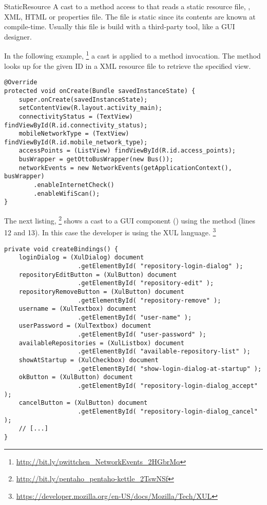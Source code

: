 \begin{pattern}{StaticResource}
A cast to a method access to that reads a static resource file, \eg,
XML, HTML or \java{} properties file.
The file is static since its contents are known at compile-time.
Usually this file is build with a third-party tool, like a GUI designer.

\instances{}
In the following example,%
\footnote{\url{http://bit.ly/pwittchen_NetworkEvents_2HGbrMq}}
a cast is applied to a  method invocation.
The  method looks up for the given ID in a XML resource file to retrieve the specified view. 

\begin{verbatim}
@Override
protected void onCreate(Bundle savedInstanceState) {
    super.onCreate(savedInstanceState);
    setContentView(R.layout.activity_main);
    connectivityStatus = (TextView) findViewById(R.id.connectivity_status);
    mobileNetworkType = (TextView) findViewById(R.id.mobile_network_type);
    accessPoints = (ListView) findViewById(R.id.access_points);
    busWrapper = getOttoBusWrapper(new Bus());
    networkEvents = new NetworkEvents(getApplicationContext(), busWrapper)
        .enableInternetCheck()
        .enableWifiScan();
}
\end{verbatim}

The next listing,%
\footnote{\url{http://bit.ly/pentaho_pentaho-kettle_2TswNSf}}
shows a cast to a GUI component () using the  method (lines 12 and 13).
In this case the developer is using the XUL language.%
\footnote{\url{https://developer.mozilla.org/en-US/docs/Mozilla/Tech/XUL}}

\begin{verbatim}
private void createBindings() {
    loginDialog = (XulDialog) document
                    .getElementById( "repository-login-dialog" );
    repositoryEditButton = (XulButton) document
                    .getElementById( "repository-edit" );
    repositoryRemoveButton = (XulButton) document
                    .getElementById( "repository-remove" );
    username = (XulTextbox) document
                    .getElementById( "user-name" );
    userPassword = (XulTextbox) document
                    .getElementById( "user-password" );
    availableRepositories = (XulListbox) document
                    .getElementById( "available-repository-list" );
    showAtStartup = (XulCheckbox) document
                    .getElementById( "show-login-dialog-at-startup" );
    okButton = (XulButton) document
                    .getElementById( "repository-login-dialog_accept" );
    cancelButton = (XulButton) document
                    .getElementById( "repository-login-dialog_cancel" );
    // [...]
}
\end{verbatim}



\end{pattern}

